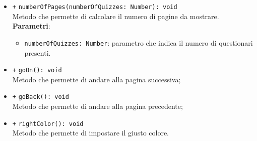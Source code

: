 \begin{itemize}
\begin{itemize}
			\item \texttt{+} \texttt{numberOfPages(numberOfQuizzes: Number): void} \\ Metodo che permette di calcolare il numero di pagine da mostrare. \\
			\textbf{Parametri}:
			\begin{itemize}
				\item \texttt{numberOfQuizzes: Number}: parametro che indica il numero di questionari presenti.
			\end{itemize}
			\item \texttt{+} \texttt{goOn(): void} \\ Metodo che permette di andare alla pagina successiva; \\
			\item \texttt{+} \texttt{goBack(): void} \\ Metodo che permette di andare alla pagina precedente; \\
			\item \texttt{+} \texttt{rightColor(): void} \\ Metodo che permette di impostare il giusto colore. \\
		\end{itemize}
	\end{itemize}
	
	